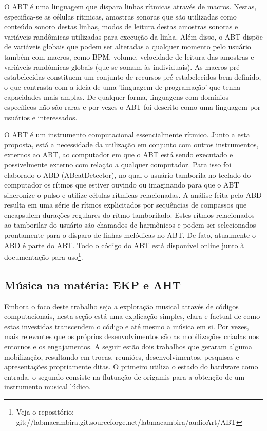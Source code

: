 O ABT é uma linguagem que dispara linhas rítmicas através
de macros. Nestas, especifica-se as células rítmicas, amostras sonoras que
são utilizadas como conteúdo sonoro destas linhas, modos de leitura
destas amostras sonoras e variáveis randômicas utilizadas para
execução da linha. Além disso, o ABT dispõe de variáveis globais que
podem ser alteradas a qualquer momento pelo usuário também com macros, como BPM, volume,
velocidade de leitura das amostras e variáveis randômicas globais (que
se somam às individuais).
As macros
pré-estabelecidas constituem um conjunto de recursos pré-estabelecidos
bem definido, o que contrasta com a ideia de uma 'linguagem de
programação' que tenha capacidades mais amplas. De qualquer forma,
linguagens com domínios específicos não são raras e por vezes o ABT
foi descrito como uma linguagem por usuários e interessados.

O ABT é um instrumento computacional essencialmente rítmico. Junto a esta
proposta, está a necessidade da utilização em conjunto com outros
instrumentos, externos ao ABT, ao computador em que o ABT está sendo executado
e possivelmente externo com relação a qualquer computador. Para isso
foi elaborado o ABD (ABeatDetector), no qual o usuário tamborila no
teclado do computador os rítmos que estiver ouvindo ou imaginando para
que o ABT sincronize o pulso e utilize células rítmicas
relacionadas. A análise feita pelo ABD resulta em uma série de rítmos
explicitados por sequências de compassos que encapsulem durações
regulares do rítmo tamborilado. Estes rítmos relacionados ao
tamborilar do usuário são chamados de harmônicos e podem ser
selecionados prontamente para o disparo de linhas melódicas no ABT.
De fato, atualmente o ABD é parte do ABT.
Todo o código do
ABT está disponivel online junto à documentação para uso\footnote{Veja o
repositório: git://labmacambira.git.sourceforge.net/labmacambira/audioArt/ABT}.


\subsection{Música na matéria: EKP e AHT}
\label{aht}

Embora o foco deste trabalho seja a exploração musical através de
códigos computacionais, nesta seção está uma explicação simples,
clara e factual de como estas investidas transcendem o código e até
mesmo a música em si.
Por vezes, mais relevantes que os próprios desenvolvimentos são as mobilizações
criadas nos entornos e os engajamentos.
A seguir estão dois trabalhos que geraram alguma mobilização,
resultando em trocas, reuniões, desenvolvimentos, pesquisas e
apresentações propriamente ditas. O primeiro utiliza o estado do
hardware como entrada, o segundo consiste na
flutuação de origamis para a obtenção de um instrumento musical
lúdico.


